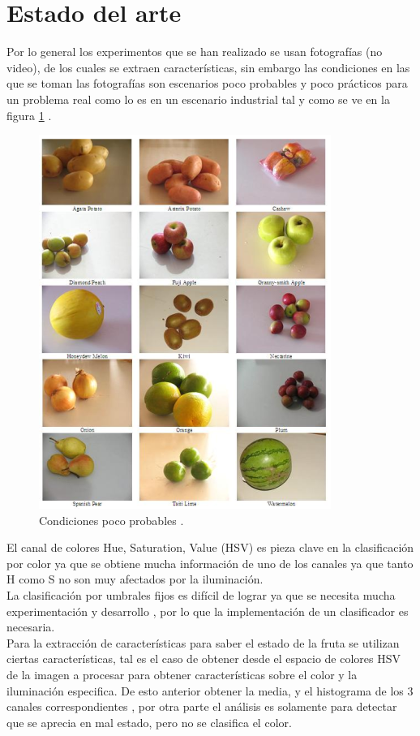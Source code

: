 \documentclass[twoside,spanish,ESP,MSc]{plantillaLabUPV}
\theoremstyle{definition}
\begin{document}
\section{Estado del arte}
Por lo general los experimentos que se han realizado se usan fotografías (no video), de los cuales se extraen características, sin embargo las condiciones en las que se toman las fotografías son escenarios poco probables y poco prácticos para un problema real como lo es en un escenario industrial tal y como se ve en la figura \ref{chafa} \cite{chafafrut}.

 \begin{figure}[h]
\centering
\includegraphics*[scale=0.5]{datchafa} 
\caption{Condiciones poco probables \cite{chafafrut}.}
\label{chafa}
\end{figure}

El canal de colores Hue, Saturation, Value (HSV) es pieza clave en la clasificación por color \cite{analis,chokun,rgbhisto,huehue} ya que se obtiene mucha información de uno de los canales ya que tanto H como S no son muy afectados por la iluminación.\\

La clasificación por umbrales fijos es difícil de lograr ya que se necesita mucha experimentación y desarrollo \cite{huehue,josu}, por lo que la implementación de un clasificador es necesaria.\\

Para la extracción de características para saber el estado de la fruta se utilizan ciertas características, tal es el caso de obtener desde el espacio de colores HSV de la imagen a procesar para obtener características sobre el color y la iluminación especifica. De esto anterior obtener la media, y el histograma de los 3 canales correspondientes \cite{analis,chokun}, por otra parte el análisis es solamente para detectar que se aprecia en mal estado, pero no se clasifica el color.\\
\end{document}

